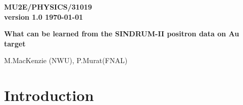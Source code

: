 \documentclass[12pt]{article}
\newcommand {\mumepconv} {\mbox{$\mu^- A \rightarrow e^+ A$}}
\begin{document}
\begin{titlepage}
  \begin{flushright}
    \bf {MU2E/PHYSICS/31019} \\
    version 1.0
    \today
  \end{flushright}

  \vspace{1cm}
  
  \begin{center}
    {\Large \bf What can be learned from the SINDRUM-II positron data on Au target} 
    
    \vspace{1cm}
    
    M.MacKenzie (NWU), P.Murat(FNAL)
    
    \vspace{0.3cm}
    
    \vspace{0.8cm}                           
  \end{center}

  \begin{abstract}

    Positron data of the SINDRUM-II experiment on Au target have
    an interesting feature near the spectrum endpoint.
    We are trying to understand implications of that for the Mu2e
    search for \mumepconv\ .
    
  \end{abstract}

\end{titlepage}
%
%
%
{\tableofcontents}

% 


\newpage
\section { Introduction}
\end{document}
